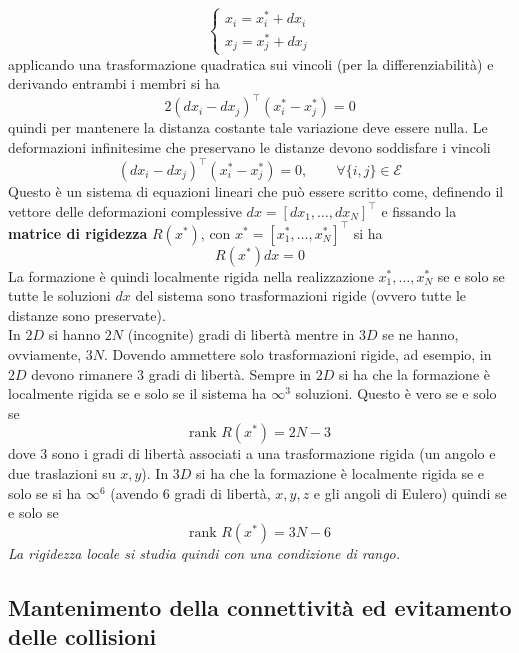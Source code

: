 \begin{equation}
\begin{cases}
x_i = x_i^* + dx_i \\
x_j = x_j^* + dx_j
\end{cases}
\end{equation} applicando una trasformazione quadratica sui vincoli (per la differenziabilit\`a) e derivando entrambi i membri si ha
\begin{equation}
2( dx_i - dx_j)^\intercal ( x_i^* - x_j^*) = 0
\end{equation} quindi per mantenere la distanza costante tale variazione deve essere nulla. Le deformazioni infinitesime che preservano le distanze devono soddisfare i vincoli
\begin{equation}
( dx_i - dx_j)^\intercal ( x_i^* - x_j^*) = 0, \qquad \forall \{i,j\} \in \mathcal{E}
\end{equation} Questo \`e un sistema di equazioni lineari che pu\`o essere scritto come, definendo il vettore delle deformazioni complessive $dx = [dx_1, \dots, dx_N]^\intercal $ e fissando la \textbf{matrice di rigidezza} $R(x^*)$, con $x^* = [x_1^*, \dots, x_N^*]^\intercal $ si ha
\begin{equation}
R(x^*) dx = 0
\end{equation}
La formazione \`e quindi localmente rigida nella realizzazione $x_1^*, \dots, x_N^*$ se e solo se tutte le soluzioni $dx$ del sistema sono trasformazioni rigide (ovvero tutte le distanze sono preservate).\\
In $2D$ si hanno $2N$ (incognite) gradi di libert\`a mentre in $3D$ se ne hanno, ovviamente, $3N$. Dovendo ammettere solo trasformazioni rigide, ad esempio, in $2D$ devono rimanere $3$ gradi di libert\`a. Sempre in $2D$ si ha che la formazione \`e localmente rigida se e solo se il sistema ha $\infty^3$ soluzioni. Questo \`e vero se e solo se
\begin{equation}
\text{rank }R(x^*) = 2N - 3
\end{equation} dove $3$ sono i gradi di libert\`a associati a una trasformazione rigida (un angolo e due traslazioni su $x,y$).
In $3D$ si ha che la formazione \`e localmente rigida se e solo se si ha $\infty^6$ (avendo 6 gradi di libert\`a, $x,y,z$ e gli angoli di Eulero) quindi se e solo se 
\begin{equation}
\text{rank }R(x^*) = 3N - 6
\end{equation}
\textit{La rigidezza locale si studia quindi con una condizione di rango.}

\subsection{Mantenimento della connettivit\`a ed evitamento delle collisioni}

